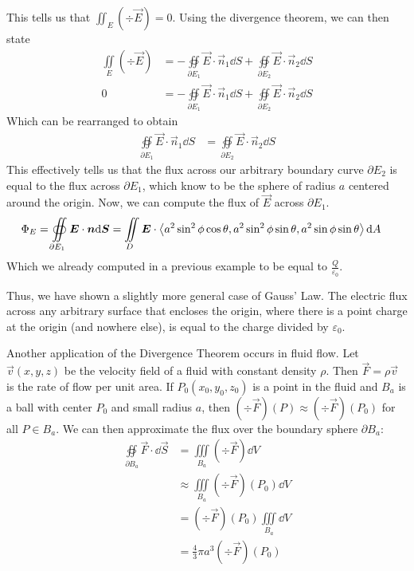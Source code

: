 This tells us that $\iint_E (\div \vec E) = 0$. Using the divergence theorem, we can then state
\begin{align*}
    \iint\limits_E (\div \vec E) &= -\oiint\limits_{\partial E_1}\vec E\cdot \vec n_1\dd S+\oiint\limits_{\partial E_2}\vec E\cdot \vec n_2\dd S \\
    0 &= -\oiint\limits_{\partial E_1}\vec E\cdot \vec n_1\dd S+\oiint\limits_{\partial E_2}\vec E\cdot \vec n_2\dd S
\end{align*}
Which can be rearranged to obtain
\begin{align*}
    \oiint\limits_{\partial E_1}\vec E\cdot \vec n_1\dd S &= \oiint\limits_{\partial E_2}\vec E\cdot \vec n_2\dd S 
\end{align*}
This effectively tells us that the flux across our arbitrary boundary curve $\partial E_2$ is equal to the flux across $\partial E_1$, which know to be the sphere of radius $a$ centered around the origin. Now, we can compute the flux of $\vec E$ across $\partial E_1$. 
\begin{align*}
    \Phi_E = \oiint\limits_{\partial E_1}\boldsymbol{E} \cdot \boldsymbol{n}\dd \boldsymbol{S} &= \iint\limits_D \boldsymbol{E} \cdot \left\langle a^2\sin^2\phi\cos\theta, a^2\sin^2\phi\sin\theta, a^2\sin\phi\sin\theta\right\rangle\dd A
\end{align*}
Which we already computed in a previous example to be equal to $\frac{Q}{\varepsilon_0}$. \par
Thus, we have shown a slightly more general case of Gauss' Law. The electric flux across any arbitrary surface that encloses the origin, where there is a point charge at the origin (and nowhere else), is equal to the charge divided by $\varepsilon_0$. \par
Another application of the Divergence Theorem occurs in fluid flow. Let $\vec v(x,y,z)$ be the velocity field of a fluid with constant density $\rho$. Then $\vec F = \rho \vec v$ is the rate of flow per unit area. If $P_0(x_0,y_0,z_0)$ is a point in the fluid and $B_a$ is a ball with center $P_0$ and small radius $a$, then $(\div \vec F)(P) \approx (\div \vec F)(P_0)$ for all $P\in B_a$. We can then approximate the flux over the boundary sphere $\partial B_a$:
\begin{align*}
    \oiint\limits_{\partial B_a}\vec F \cdot \dd \vec S &= \iiint\limits_{B_a}(\div \vec F)\dd V \\
    &\approx \iiint\limits_{B_a} (\div \vec F)(P_0)\dd V \\
    &= (\div \vec F)(P_0)\iiint\limits_{B_a}\dd V \\
    &= \frac{4}{3}\pi a^3 (\div \vec F)(P_0)
\end{align*}
